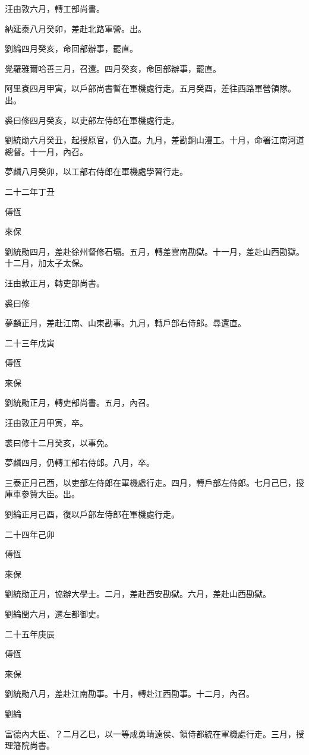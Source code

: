 \begin{pinyinscope}
汪由敦六月，轉工部尚書。

納延泰八月癸卯，差赴北路軍營。出。

劉綸四月癸亥，命回部辦事，罷直。

覺羅雅爾哈善三月，召還。四月癸亥，命回部辦事，罷直。

阿里袞四月甲寅，以戶部尚書暫在軍機處行走。五月癸酉，差往西路軍營領隊。出。

裘曰修四月癸亥，以吏部左侍郎在軍機處行走。

劉統勛六月癸丑，起授原官，仍入直。九月，差勘銅山漫工。十月，命署江南河道總督。十一月，內召。

夢麟八月癸卯，以工部右侍郎在軍機處學習行走。

二十二年丁丑

傅恆

來保

劉統勛四月，差赴徐州督修石壩。五月，轉差雲南勘獄。十一月，差赴山西勘獄。十二月，加太子太保。

汪由敦正月，轉吏部尚書。

裘曰修

夢麟正月，差赴江南、山東勘事。九月，轉戶部右侍郎。尋還直。

二十三年戊寅

傅恆

來保

劉統勛正月，轉吏部尚書。五月，內召。

汪由敦正月甲寅，卒。

裘曰修十二月癸亥，以事免。

夢麟四月，仍轉工部右侍郎。八月，卒。

三泰正月己酉，以吏部左侍郎在軍機處行走。四月，轉戶部左侍郎。七月己巳，授庫車參贊大臣。出。

劉綸正月己酉，復以戶部左侍郎在軍機處行走。

二十四年己卯

傅恆

來保

劉統勛正月，協辦大學士。二月，差赴西安勘獄。六月，差赴山西勘獄。

劉綸閏六月，遷左都御史。

二十五年庚辰

傅恆

來保

劉統勛八月，差赴江南勘事。十月，轉赴江西勘事。十二月，內召。

劉綸

富德內大臣、？二月乙巳，以一等成勇靖遠侯、領侍都統在軍機處行走。三月，授理籓院尚書。


\end{pinyinscope}
